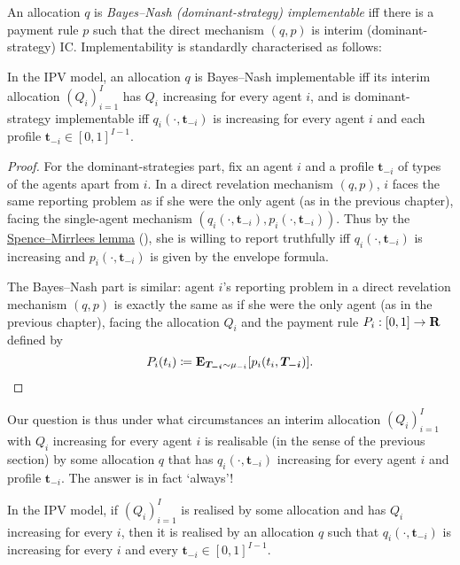 An allocation $q$ is \emph{Bayes--Nash (dominant-strategy) implementable}
iff there is a payment rule $p$ such that the direct mechanism $(q,p)$ is interim (dominant-strategy) IC.
Implementability is standardly characterised as follows:

\begin{lemma}
	\label{lemma:impl_mon}
	In the IPV model,
	an allocation $q$
	is Bayes--Nash implementable iff its interim allocation $(Q_i)_{i=1}^I$ has $Q_i$ increasing for every agent $i$,
	and is dominant-strategy implementable iff $q_i(\cdot,\boldsymbol{t}_{-i})$ is increasing for every agent $i$ and each profile $\boldsymbol{t}_{-i} \in [0,1]^{I-1}$.
\end{lemma}

\begin{proof}
	For the dominant-strategies part,
	fix an agent $i$
	and a profile $\boldsymbol{t}_{-i}$ of types of the agents apart from $i$.
	In a direct revelation mechanism $(q,p)$,
	$i$ faces the same reporting problem
	as if she were the only agent (as in the previous chapter), facing the single-agent mechanism $\left( q_i\left(\cdot,\boldsymbol{t}_{-i}\right), p_i\left(\cdot,\boldsymbol{t}_{-i}\right) \right)$.
	Thus by the \hyperref[proposition:SM_lemma]{Spence--Mirrlees lemma} (), she is willing to report truthfully iff $q_i\left(\cdot,\boldsymbol{t}_{-i}\right)$ is increasing and $p_i\left(\cdot,\boldsymbol{t}_{-i} \right)$ is given by the envelope formula.

	The Bayes--Nash part is similar:
	agent $i$'s reporting problem in a direct revelation mechanism $(q,p)$
	is exactly the same as if she were the only agent (as in the previous chapter),
	facing the allocation $Q_i$ and the payment rule $P_i : [0,1] \to \mathbf{R}$ defined by
	\begin{equation*}
		P_i(t_i)
		\coloneqq \E_{\boldsymbol{T_{-i}} \sim \mu_{-i}}\left[ p_i(t_i,\boldsymbol{T_{-i}}) \right] . \qedhere
	\end{equation*}
\end{proof}

Our question is thus under what circumstances an interim allocation $(Q_i)_{i=1}^I$ with $Q_i$ increasing for every agent $i$
is realisable (in the sense of the previous section) by some allocation $q$ that has $q_i(\cdot,\boldsymbol{t}_{-i})$ increasing for every agent $i$ and profile $\boldsymbol{t}_{-i}$.
The answer is in fact `always'!

\begin{theorem}
	\label{theorem:manellivincent}
	In the IPV model,
	if $(Q_i)_{i=1}^I$ is realised by some allocation
	and has $Q_i$ increasing for every $i$,
	then it is realised by an allocation $q$ such that $q_i(\cdot,\boldsymbol{t}_{-i})$ is increasing for every $i$ and every $\boldsymbol{t}_{-i} \in [0,1]^{I-1}$.
\end{theorem}


